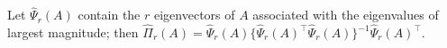 Let \(\widehat\Psi_r(A)\) contain the \(r\) eigenvectors of \(A\) associated with the eigenvalues of largest magnitude; then \(\widehat\Pi_r(A)=\widehat\Psi_r(A)\{\widehat\Psi_r(A)^\top\widehat\Psi_r(A)\}^{-1}\widehat\Psi_r(A)^\top\).
